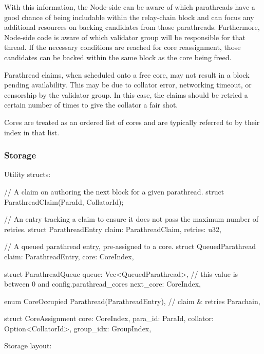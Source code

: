 With this information, the Node-side can be aware of which parathreads have a
good chance of being includable within the relay-chain block and can focus any
additional resources on backing candidates from those parathreads. Furthermore,
Node-side code is aware of which validator group will be responsible for that
thread. If the necessary conditions are reached for core reassignment, those
candidates can be backed within the same block as the core being freed.
\newline

Parathread claims, when scheduled onto a free core, may not result in a block
pending availability. This may be due to collator error, networking timeout, or
censorship by the validator group. In this case, the claims should be retried a
certain number of times to give the collator a fair shot.
\newline

Cores are treated as an ordered list of cores and are typically referred to by
their index in that list.

\subsubsection{Storage}

Utility structs:

\begin{verbnobox}[\small]
// A claim on authoring the next block for a given parathread.
struct ParathreadClaim(ParaId, CollatorId);

// An entry tracking a claim to ensure it does not pass the maximum number of retries.
struct ParathreadEntry {
  claim: ParathreadClaim,
  retries: u32,
}

// A queued parathread entry, pre-assigned to a core.
struct QueuedParathread {
	claim: ParathreadEntry,
	core: CoreIndex,
}

struct ParathreadQueue {
	queue: Vec<QueuedParathread>,
	// this value is between 0 and config.parathread_cores
	next_core: CoreIndex,
}

enum CoreOccupied {
  Parathread(ParathreadEntry), // claim & retries
  Parachain,
}

struct CoreAssignment {
  core: CoreIndex,
  para_id: ParaId,
  collator: Option<CollatorId>,
  group_idx: GroupIndex,
}
\end{verbnobox}

Storage layout:


